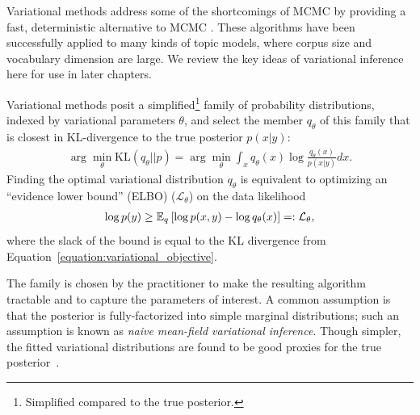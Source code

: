 Variational methods address some of the shortcomings of MCMC by
providing a fast, deterministic alternative to MCMC
\citep{jordan:2003,jordan:1999}. These algorithms have been
successfully applied to many kinds of topic models, where corpus size
and vocabulary dimension are large.  We review the key ideas of
variational inference here for use in later chapters.

Variational methods posit a simplified\footnote{Simplified compared to
  the true posterior.} family of probability distributions, indexed by
variational parameters $\theta$, and select the member $q_\theta$ of
this family that is closest in KL-divergence to the true posterior
$p(x | y)$:
\begin{align}
  \arg \min_{\theta} \mbox{KL}(q_\theta || p) = \arg \min_{\theta} \int_x q_\theta(x) \log \frac{q_\theta(x)}{p(x | y)} dx.
  \label{equation:variational_objective}
\end{align}
Finding the optimal variational distribution $q_\theta$ is equivalent
to optimizing an ``evidence lower bound'' (ELBO) ($\mathcal{L}_\theta$) on
the data likelihood
\begin{eqnarray}
  \log p(y) \ge \mathbb{E}_q\left[\log p(x, y) - \log q_\theta(x)\right]
  =: \mathcal{L}_\theta,
  \label{equation:traditional_variational_objective}
\end{eqnarray}
where the slack of the bound is equal to the KL divergence from
Equation~\ref{equation:variational_objective}.

The family is chosen by the practitioner to make the resulting
algorithm tractable and to capture the parameters of interest. A
common assumption is that the posterior is fully-factorized into
simple marginal distributions; such an assumption is known as
\emph{naive mean-field variational inference}. Though simpler, the
fitted variational distributions are found to be good proxies for the
true posterior~\citep{jordan:1999,gerrish:2011}.

